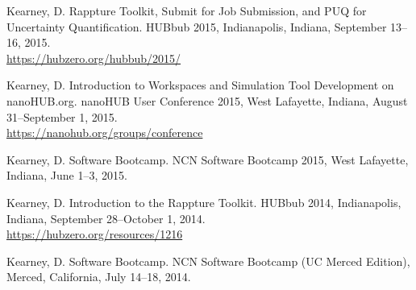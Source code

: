 \documentclass[10pt]{article}
\renewcommand\emph[1]{#1}
\begin{document}
\begin{bibenum}

    \item Kearney, D. Rappture Toolkit, Submit for Job Submission, and
        PUQ for Uncertainty Quantification. \emph{HUBbub 2015},
        Indianapolis, Indiana, September 13--16, 2015. \\
        \url{https://hubzero.org/hubbub/2015/}

    \item Kearney, D. Introduction to Workspaces and Simulation Tool
        Development on nanoHUB.org. \emph{nanoHUB User Conference 2015},
        West Lafayette, Indiana, August 31--September 1, 2015. \\
        \url{https://nanohub.org/groups/conference}

    \item Kearney, D. Software Bootcamp. \emph{NCN Software Bootcamp 2015},
        West Lafayette, Indiana, June 1--3, 2015.

    \item Kearney, D. Introduction to the Rappture Toolkit.
        \emph{HUBbub 2014}, Indianapolis, Indiana, September 28--October 1, 2014. \\
        \url{https://hubzero.org/resources/1216}

    \item Kearney, D. Software Bootcamp.
        \emph{NCN Software Bootcamp (UC Merced Edition)}, Merced, California,
        July 14--18, 2014.

\end{bibenum}
\end{document}
